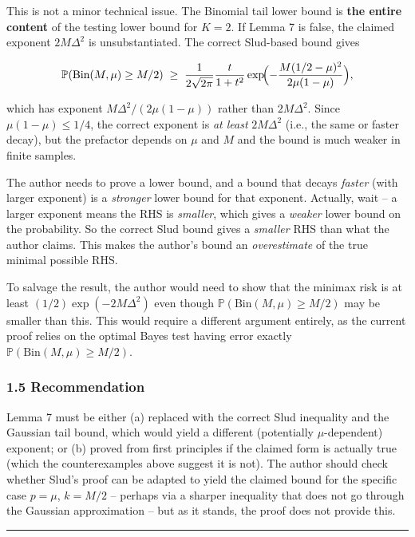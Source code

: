 \documentclass[
  12pt,
]{ctexart}
\begin{document}
This is not a minor technical issue. The Binomial tail lower bound is
\textbf{the entire content} of the testing lower bound for \(K=2\). If
Lemma 7 is false, the claimed exponent \(2M\Delta^2\) is
unsubstantiated. The correct Slud-based bound gives

\[\mathbb{P}(\text{Bin}(M,\mu) \geq M/2) \;\geq\; \frac{1}{2\sqrt{2\pi}}\frac{t}{1+t^2}\exp\!\Bigl(-\frac{M(1/2-\mu)^2}{2\mu(1-\mu)}\Bigr),\]

which has exponent \(M\Delta^2/(2\mu(1-\mu))\) rather than
\(2M\Delta^2\). Since \(\mu(1-\mu) \leq 1/4\), the correct exponent is
\emph{at least} \(2M\Delta^2\) (i.e., the same or faster decay), but the
prefactor depends on \(\mu\) and \(M\) and the bound is much weaker in
finite samples.

The author needs to prove a lower bound, and a bound that decays
\emph{faster} (with larger exponent) is a \emph{stronger} lower bound
for that exponent. Actually, wait -- a larger exponent means the RHS is
\emph{smaller}, which gives a \emph{weaker} lower bound on the
probability. So the correct Slud bound gives a \emph{smaller} RHS than
what the author claims. This makes the author's bound an
\emph{overestimate} of the true minimal possible RHS.

To salvage the result, the author would need to show that the minimax
risk is at least \((1/2)\exp(-2M\Delta^2)\) even though
\(\mathbb{P}(\text{Bin}(M,\mu) \geq M/2)\) may be smaller than this.
This would require a different argument entirely, as the current proof
relies on the optimal Bayes test having error exactly
\(\mathbb{P}(\text{Bin}(M,\mu) \geq M/2)\).

\subsubsection{1.5 Recommendation}\label{recommendation}

Lemma 7 must be either (a) replaced with the correct Slud inequality and
the Gaussian tail bound, which would yield a different (potentially
\(\mu\)-dependent) exponent; or (b) proved from first principles if the
claimed form is actually true (which the counterexamples above suggest
it is not). The author should check whether Slud's proof can be adapted
to yield the claimed bound for the specific case \(p=\mu\), \(k=M/2\) --
perhaps via a sharper inequality that does not go through the Gaussian
approximation -- but as it stands, the proof does not provide this.

\begin{center}\rule{0.5\linewidth}{0.5pt}\end{center}
\end{document}
